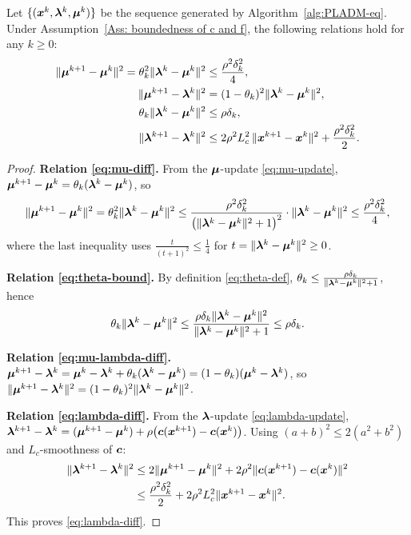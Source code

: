 \documentclass[10pt]{article}
\begin{document}
\begin{lemma}
\label{lem:basic-relations}
Let $\{(\bm{x}^k, \bm{\lambda}^k, \bm{\mu}^k)\}$ be the sequence generated by 
Algorithm~\ref{alg:PLADM-eq}. Under Assumption~\ref{Ass: boundedness of c and f}, the following 
relations hold for any $k \geq 0$:
\begin{align}
    \|\bm{\mu}^{k+1} - \bm{\mu}^k\|^2 = \theta_k^2 \|\bm{\lambda}^{k} - \bm{\mu}^k\|^2  &\leq \frac{\rho^2\delta_k^2}{4}, 
    \label{eq:mu-diff}\\
    \|\bm{\mu}^{k+1} - \bm{\lambda}^k\|^2 &= (1-\theta_k)^2\|\bm{\lambda}^k - \bm{\mu}^k\|^2,
    \label{eq:mu-lambda-diff}\\
    \theta_k \|\bm{\lambda}^k - \bm{\mu}^k\|^2 &\leq \rho\delta_k, 
    \label{eq:theta-bound}\\
    \|\bm{\lambda}^{k+1} - \bm{\lambda}^k\|^2 &\leq 
    2\rho^2 L_c^2\,\|\bm{x}^{k+1} - \bm{x}^k\|^2 + \frac{\rho^2\delta_k^2}{2}.
    \label{eq:lambda-diff}
\end{align}
\end{lemma}
\begin{proof}
\textbf{Relation \eqref{eq:mu-diff}.}
From the $\bm{\mu}$-update \eqref{eq:mu-update},
$\bm{\mu}^{k+1} - \bm{\mu}^k = \theta_k(\bm{\lambda}^k - \bm{\mu}^k)$, so
\begin{align*}
  \|\bm{\mu}^{k+1} - \bm{\mu}^k\|^2
  = \theta_k^2\|\bm{\lambda}^k - \bm{\mu}^k\|^2
  \leq \frac{\rho^2\delta_k^2}{\bigl(\|\bm{\lambda}^k-\bm{\mu}^k\|^2+1\bigr)^2}
    \cdot \|\bm{\lambda}^k-\bm{\mu}^k\|^2
  \leq \frac{\rho^2\delta_k^2}{4},
\end{align*}
where the last inequality uses $\frac{t}{(t+1)^2} \leq \frac{1}{4}$ for $t = \|\bm{\lambda}^k-\bm{\mu}^k\|^2 \geq 0$.
 
\textbf{Relation \eqref{eq:theta-bound}.}
By definition \eqref{eq:theta-def},
$\theta_k \leq \frac{\rho\delta_k}{\|\bm{\lambda}^k-\bm{\mu}^k\|^2+1}$, hence
\begin{align*}
  \theta_k\|\bm{\lambda}^k-\bm{\mu}^k\|^2
  \leq \frac{\rho\delta_k\|\bm{\lambda}^k-\bm{\mu}^k\|^2}{\|\bm{\lambda}^k-\bm{\mu}^k\|^2+1}
  \leq \rho\delta_k.
\end{align*}
 
\textbf{Relation \eqref{eq:mu-lambda-diff}.}
$\bm{\mu}^{k+1} - \bm{\lambda}^k = \bm{\mu}^k - \bm{\lambda}^k + \theta_k(\bm{\lambda}^k-\bm{\mu}^k)
= (1-\theta_k)(\bm{\mu}^k - \bm{\lambda}^k)$,
so $\|\bm{\mu}^{k+1}-\bm{\lambda}^k\|^2 = (1-\theta_k)^2\|\bm{\lambda}^k-\bm{\mu}^k\|^2$.
 
\textbf{Relation \eqref{eq:lambda-diff}.}
From the $\bm{\lambda}$-update \eqref{eq:lambda-update},
$\bm{\lambda}^{k+1} - \bm{\lambda}^k
= (\bm{\mu}^{k+1}-\bm{\mu}^k) + \rho\bigl(\bm{c}(\bm{x}^{k+1})-\bm{c}(\bm{x}^k)\bigr)$.
Using $(a+b)^2 \leq 2(a^2+b^2)$ and $L_c$-smoothness of $\bm{c}$:
\begin{align*}
  \|\bm{\lambda}^{k+1}-\bm{\lambda}^k\|^2
  &\leq 2\|\bm{\mu}^{k+1}-\bm{\mu}^k\|^2 + 2\rho^2\|\bm{c}(\bm{x}^{k+1})-\bm{c}(\bm{x}^k)\|^2 \\
  &\leq \frac{\rho^2\delta_k^2}{2} + 2\rho^2 L_c^2\|\bm{x}^{k+1}-\bm{x}^k\|^2.
\end{align*}
This proves \eqref{eq:lambda-diff}. \eproof
\end{proof}
\end{document}
